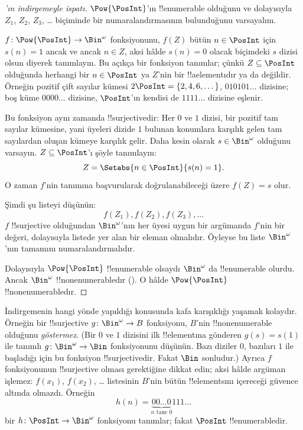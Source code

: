 \begin{proof}[{}'ın indirgemeyle ispatı]
$\Pow{\PosInt}$'ın !!{enumerable} olduğunu ve dolayısıyla $Z_1$, $Z_2$,
$Z_3$, \dots{} biçiminde bir numaralandırmasının bulunduğunu varsayalım.

$f\colon\Pow{\PosInt}\to\Bin^\omega$ fonksiyonunu, $f(Z)$ bütün
$n\in\PosInt$ için $s(n)=1$ ancak ve ancak $n\in Z$, aksi hâlde $s(n)=0$
olacak biçimdeki $s$ dizisi olsun diyerek tanımlayın. Bu açıkça bir fonksiyon
tanımlar; çünkü $Z\subseteq\PosInt$ olduğunda herhangi bir $n\in\PosInt$ ya
$Z$'nin bir !!a{element}{}ıdır ya da değildir. Örneğin pozitif çift sayılar
kümesi $2\PosInt=\{2,4,6,\dots\}$, $010101\dots$ dizisine; boş küme
$0000\dots$ dizisine, $\PosInt$'ın kendisi de $1111\dots$ dizisine eşlenir.

Bu fonksiyon aynı zamanda !!{surjective}{}dir: Her $0$ ve $1$ dizisi, bir
pozitif tam sayılar kümesine, yani üyeleri dizide $1$ bulunan konumlara
karşılık gelen tam sayılardan oluşan kümeye karşılık gelir. Daha kesin olarak
$s\in\Bin^\omega$ olduğunu varsayın. $Z\subseteq\PosInt$'ı şöyle tanımlayın:
\[
Z = \Setabs{n \in \PosInt}{s(n) = 1}.
\]
O zaman $f$'nin tanımına başvurularak doğrulanabileceği üzere $f(Z)=s$ olur.

Şimdi şu listeyi düşünün:
\[
f(Z_1), f(Z_2), f(Z_3), \dots
\]
$f$ !!{surjective} olduğundan $\Bin^\omega$'nın her üyesi uygun bir argümanda
$f$'nin bir değeri, dolayısıyla listede yer alan bir eleman olmalıdır.
Öyleyse bu liste $\Bin^\omega$'nın tamamını numaralandırmalıdır.

Dolayısıyla $\Pow{\PosInt}$ !!{enumerable} olsaydı $\Bin^\omega$ da
!!{enumerable} olurdu. Ancak $\Bin^\omega$ !!{nonenumerable}{}dır
(). O hâlde $\Pow{\PosInt}$
!!{nonenumerable}{}dır.
\end{proof}

\begin{explain}
İndirgemenin hangi yönde yapıldığı konusunda kafa karışıklığı yaşamak
kolaydır. Örneğin bir !!{surjective} $g\colon\Bin^\omega\to B$ fonksiyonu,
$B$'nin !!{nonenumerable} olduğunu \emph{göstermez}. (Bir $0$ ve $1$ dizisini
ilk !!{element}{}ına gönderen $g(s)=s(1)$ ile tanımlı $g\colon\Bin^\omega\to
\Bin$ fonksiyonunu düşünün. Bazı diziler $0$, bazıları $1$ ile başladığı için
bu fonksiyon !!{surjective}{}dir. Fakat $\Bin$ sonludur.) Ayrıca $f$
fonksiyonunun !!{surjective} olması gerektiğine dikkat edin; aksi hâlde
argüman işlemez: $f(x_1)$, $f(x_2)$, \dots{} listesinin $B$'nin bütün
!!{element}s{}ını içereceği güvence altında olmazdı. Örneğin
\[
h(n) = \underbrace{00\dots0}_{\text{$n$ tane $0$}}111\dots
\]
bir $h\colon\PosInt\to\Bin^\omega$ fonksiyonu tanımlar; fakat $\PosInt$
!!{enumerable}{}dir.
\end{explain}

